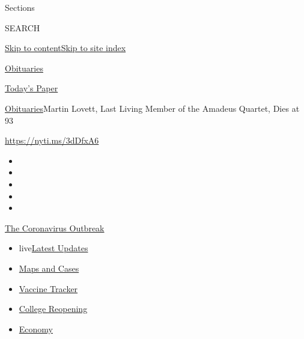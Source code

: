 Sections

SEARCH

\protect\hyperlink{site-content}{Skip to
content}\protect\hyperlink{site-index}{Skip to site index}

\href{https://www.nytimes3xbfgragh.onion/section/obituaries}{Obituaries}

\href{https://myaccount.nytimes3xbfgragh.onion/auth/login?response_type=cookie\&client_id=vi}{}

\href{https://www.nytimes3xbfgragh.onion/section/todayspaper}{Today's
Paper}

\href{/section/obituaries}{Obituaries}\textbar{}Martin Lovett, Last
Living Member of the Amadeus Quartet, Dies at 93

\url{https://nyti.ms/3dDfxA6}

\begin{itemize}
\item
\item
\item
\item
\item
\end{itemize}

\href{https://www.nytimes3xbfgragh.onion/news-event/coronavirus?action=click\&pgtype=Article\&state=default\&region=TOP_BANNER\&context=storylines_menu}{The
Coronavirus Outbreak}

\begin{itemize}
\tightlist
\item
  live\href{https://www.nytimes3xbfgragh.onion/2020/08/04/world/coronavirus-covid-19.html?action=click\&pgtype=Article\&state=default\&region=TOP_BANNER\&context=storylines_menu}{Latest
  Updates}
\item
  \href{https://www.nytimes3xbfgragh.onion/interactive/2020/us/coronavirus-us-cases.html?action=click\&pgtype=Article\&state=default\&region=TOP_BANNER\&context=storylines_menu}{Maps
  and Cases}
\item
  \href{https://www.nytimes3xbfgragh.onion/interactive/2020/science/coronavirus-vaccine-tracker.html?action=click\&pgtype=Article\&state=default\&region=TOP_BANNER\&context=storylines_menu}{Vaccine
  Tracker}
\item
  \href{https://www.nytimes3xbfgragh.onion/2020/08/02/us/covid-college-reopening.html?action=click\&pgtype=Article\&state=default\&region=TOP_BANNER\&context=storylines_menu}{College
  Reopening}
\item
  \href{https://www.nytimes3xbfgragh.onion/live/2020/08/03/business/stock-market-today-coronavirus?action=click\&pgtype=Article\&state=default\&region=TOP_BANNER\&context=storylines_menu}{Economy}
\end{itemize}

